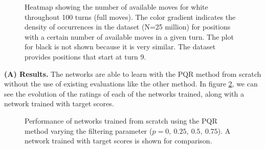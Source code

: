 \begin{figure}[H]
\centering
{}
\caption{Heatmap showing the number of available moves for white throughout 100 turns (full moves). The color gradient indicates the density of occurrences in the dataset (N=25 million) for positions with a certain number of available moves in a given turn. The plot for black is not shown because it is very similar. The dataset provides positions that start at turn 9.}
\label{avg-moves}
\end{figure}

\newpage
\textbf{(A) Results.} The networks are able to learn with the PQR method from scratch without the use of existing evaluations like the other method. In figure \ref{pqr-evolution}, we can see the evolution of the ratings of each of the networks trained, along with a network trained with target scores.

\begin{figure}[H]
\centering
{}
\caption{Performance of networks trained from scratch using the PQR method varying the filtering parameter ($p=0,\ 0.25,\ 0.5,\ 0.75$). A network trained with target scores is shown for comparison.}
\label{pqr-evolution}
\end{figure}

